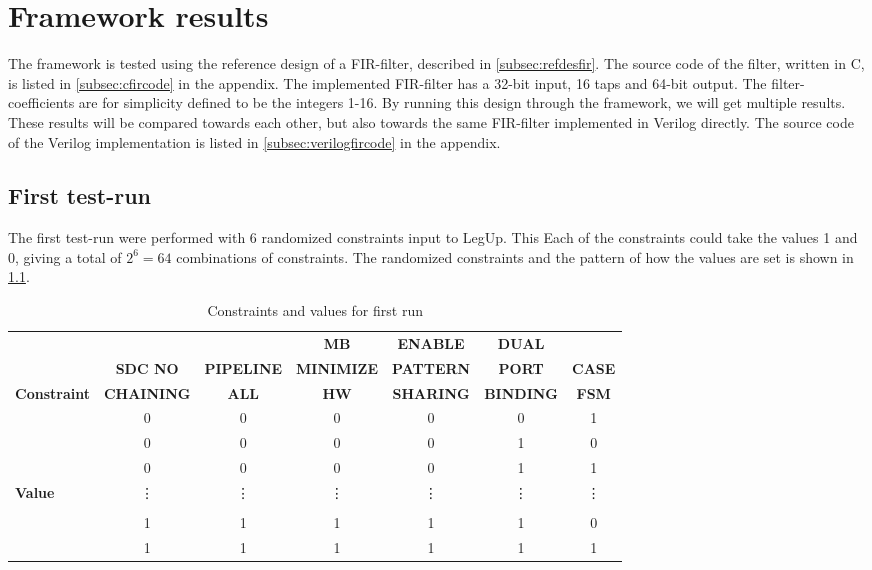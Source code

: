 \chapter{Framework results}
The framework is tested using the reference design of a FIR-filter, described in \cref{subsec:refdesfir}. The source code of the filter, written in C, is listed in \cref{subsec:cfircode} in the appendix. The implemented FIR-filter has a 32-bit input, 16 taps and 64-bit output. The filter-coefficients are for simplicity defined to be the integers 1-16. By running this design through the framework, we will get multiple results. These results will be compared towards each other, but also towards the same FIR-filter implemented in Verilog directly. The source code of the Verilog implementation is listed in \cref{subsec:verilogfircode} in the appendix.

\section{First test-run}
The first test-run were performed with 6 randomized constraints input to LegUp. This Each of the constraints could take the values 1 and 0, giving a total of $2^6=64$ combinations of constraints. The randomized constraints and the pattern of how the values are set is shown in \cref{tab:randomconstraint}.

\begin{table}
\tiny
    \begin{center}
    \begin{tabular}{l|cccccc}
     & & & \textbf{MB} & \textbf{ENABLE} & \textbf{DUAL} & \\
          &
          \textbf{SDC NO} & 
          \textbf{PIPELINE} & 
          \textbf{MINIMIZE} & 
          \textbf{PATTERN} & 
          \textbf{PORT} &
          \textbf{CASE} \\
        \textbf{Constraint}
           & \textbf{CHAINING}
           & \textbf{ALL}
           & \textbf{HW}
           & \textbf{SHARING}
           & \textbf{BINDING}
           & \textbf{FSM}
    \\ \midrule
    & 0 & 0 & 0 & 0 & 0 & 1 \\
    & 0 & 0 & 0 & 0 & 1 & 0 \\
    & 0 & 0 & 0 & 0 & 1 & 1 \\
    \textbf{Value} & \vdots & \vdots & \vdots & \vdots & \vdots & \vdots \\
    & &  &  &  &  &  \\
    & 1 & 1 & 1 & 1 & 1 & 0 \\
    & 1 & 1 & 1 & 1 & 1 & 1
    \\ \bottomrule
    \end{tabular}
    \caption{\label{tab:randomconstraint}Constraints and values for first run}
    \end{center}
\end{table}

